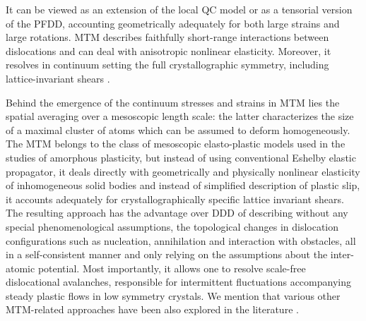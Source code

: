 \documentclass[aps,
superscriptaddress,notitlepage]{revtex4-1}
\begin{document}
It can be viewed as an extension of the local QC model or as a tensorial version of the PFDD, accounting geometrically adequately for both large strains and large rotations. MTM describes faithfully short-range interactions between dislocations and  can deal with  anisotropic nonlinear elasticity. Moreover,  it resolves in continuum setting the full crystallographic symmetry, including lattice-invariant shears \cite{Engel1986-tm,Michel2001,schwarzenberger1972classification,Bhattacharya2004,pitteri2002continuum} .

 Behind the emergence of the continuum stresses and strains in MTM lies the spatial averaging over a mesoscopic length scale: the latter characterizes the size of a maximal cluster of atoms which can be assumed to deform homogeneously. The MTM belongs to the class of mesoscopic elasto-plastic  models  used in the studies of amorphous plasticity, but instead of using conventional Eshelby elastic propagator,  it deals directly with geometrically and physically nonlinear  elasticity of inhomogeneous solid bodies and instead of simplified description of plastic slip, it accounts adequately for crystallographically specific lattice invariant shears.  The resulting approach  has the advantage over DDD of describing without any special phenomenological assumptions, the  topological changes in dislocation configurations such as nucleation, annihilation and  interaction with obstacles, all  in a self-consistent manner and only relying on the  assumptions about the  inter-atomic potential. Most importantly, it allows one to resolve  scale-free dislocational avalanches, responsible for intermittent fluctuations accompanying steady plastic flows in low symmetry crystals.  We mention that various other  MTM-related  approaches have been also explored  in the literature  \cite{Denoual2010,Gao2019,Gao2020,Gao2020a,Gao2020f,Gao2020c,Biscari2015-ci,Arbib2020,Arbib2023,Arbib2025}.
\end{document}
